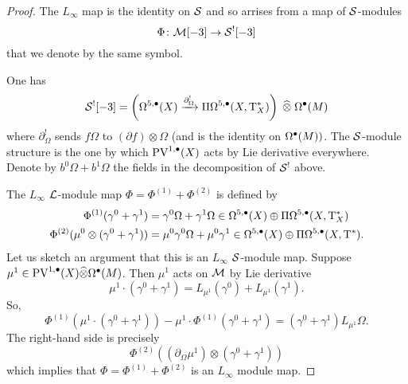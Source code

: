 \documentclass[11pt]{amsart}
\def\PV{{\rm PV}}
\def\T{{\rm T}}
\begin{document}
\begin{proof} 
The $L_\infty$ map is the identity on $\mathcal S$ and so arrises from a map of $\mathcal S$-modules 
\[
\Phi \colon \mathcal M [-3] \to \mathcal S^![-3]
\]
that we denote by the same symbol. 

One has
\[ 
\cS^! [-3] = \left(\Omega^{5, \bu}(X) \xto{\partial_\Omega^!} \Pi \Omega^{5,\bu} (X, \T^*_X) \right) \; \Hat{\otimes} \; \Omega^\bu(M) 
\]
where $\partial_\Omega^!$ sends $f \Omega$ to $(\partial f) \otimes \Omega$ (and is the identity on $\Omega^\bullet(M))$. 
The $\mathcal S$-module structure is the one by which $\PV^{1,\bu}(X)$ acts by Lie derivative everywhere. 
Denote by $b^0 \Omega + b^1 \Omega$ the fields in the decomposition of $\mathcal S^!$ above. 

The $L_\infty$ $\mathcal L$-module map $\Phi = \Phi^{(1)} + \Phi^{(2)}$ is defined by
\begin{align*}
\Phi^{(1)} (\gamma^0 + \gamma^1) & = \gamma^0 \Omega + \gamma^1 \Omega \in \Omega^{5,\bu}(X) \oplus \Pi \Omega^{5,\bu}(X, \T^*_X) \\
\Phi^{(2)} (\mu^0 \otimes (\gamma^0 + \gamma^1)) & = \mu^0 \gamma^0 \Omega + \mu^0 \gamma^1 \in \Omega^{5,\bu}(X) \oplus \Pi \Omega^{5,\bu}(X, \T^*) .
\end{align*}
Let us sketch an argument that this is an $L_\infty$ $\mathcal S$-module map.
Suppose $\mu^1 \in \PV^{1,\bu}(X) \Hat{\otimes} \Omega^\bu(M)$.
Then $\mu^1$ acts on $\mathcal M$ by Lie derivative
\[
\mu^1 \cdot (\gamma^0 + \gamma^1) = L_{\mu^1} (\gamma^0) + L_{\mu^1} (\gamma^1) .
\]
So, 
\[
\Phi^{(1)} (\mu^1 \cdot (\gamma^0 + \gamma^1)) - \mu^1 \cdot \Phi^{(1)} (\gamma^0 + \gamma^1) = (\gamma^0 + \gamma^1) L_{\mu^1} \Omega .
\]
The right-hand side is precisely
\[
\Phi^{(2)} ((\partial_\Omega \mu^1) \otimes (\gamma^0 + \gamma^1))
\]
which implies that $\Phi = \Phi^{(1)} + \Phi^{(2)}$ is an $L_\infty$ module map.




\end{proof}
\end{document}
